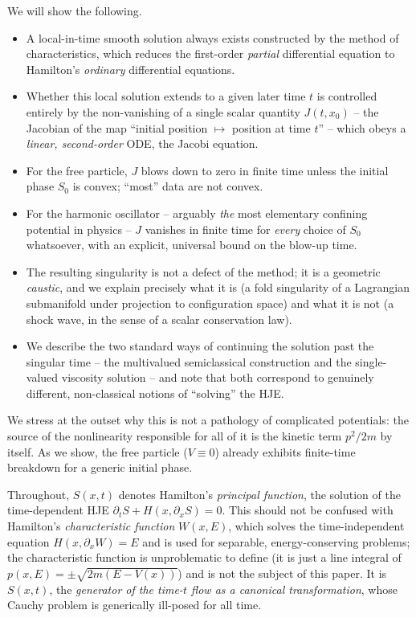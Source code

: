 We will show the following.
\begin{itemize}
\item[(i)] A local-in-time smooth solution always exists
     constructed by the method of
        characteristics, which reduces the first-order \emph{partial}
        differential equation to Hamilton's \emph{ordinary} differential
        equations.
\item[(ii)] Whether this local solution extends to a given later time $t$ is
    controlled entirely by the non-vanishing of a single scalar quantity
        $J(t,x_0)$ -- the Jacobian of the map ``initial position $\mapsto$
        position at time $t$'' -- which obeys a \emph{linear, second-order}
        ODE, the Jacobi equation.
\item[(iii)] For the free particle, $J$ blows down to zero in finite time
    unless the initial phase $S_0$ is convex; ``most'' data are not convex.
\item[(iv)] For the harmonic oscillator -- arguably \emph{the} most elementary
    confining potential in physics -- $J$ vanishes in finite time for
        \emph{every} choice of $S_0$ whatsoever, with an explicit, universal
        bound on the blow-up time.
\item[(v)] The resulting singularity is not a defect of the method; it is a
    geometric \emph{caustic}, and we explain precisely what it is (a fold
        singularity of a Lagrangian submanifold under projection to
        configuration space) and what it is not (a shock wave, in the sense of
        a scalar conservation law).
\item[(vi)] We describe the two standard ways of continuing the solution past
    the singular time -- the multivalued semiclassical construction and the
        single-valued viscosity solution -- and note that both correspond to
        genuinely different, non-classical notions of ``solving'' the HJE.
\end{itemize}

We stress at the outset why this is not a pathology of complicated potentials:
the source of the nonlinearity responsible for all of it is the kinetic term
$p^2/2m$ by itself. As we show, the free particle
($V\equiv 0$) already exhibits finite-time breakdown for a generic initial
phase.

\begin{remark}
    Throughout, $S(x,t)$ denotes Hamilton's \emph{principal function}, the solution
    of the time-dependent HJE $\partial_tS + H(x,\partial_xS)=0$. This should
    not be confused with Hamilton's \emph{characteristic function} $W(x,E)$,
    which solves the time-independent equation $H(x,\partial_xW)=E$ and is used
    for separable, energy-conserving problems; the characteristic function is
    unproblematic to define (it is just a line integral of
    $p(x,E)=\pm\sqrt{2m(E-V(x))}$) and is not the subject of this paper. It is
    $S(x,t)$, the \emph{generator of the time-$t$ flow as a canonical
    transformation}, whose Cauchy problem is generically ill-posed for all
    time.
\end{remark}

